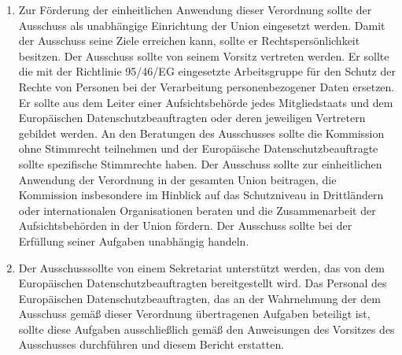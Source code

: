\begin{enumerate}
   \item Zur Förderung der einheitlichen Anwendung dieser Verordnung sollte der Ausschuss als unabhängige Einrichtung
    der Union eingesetzt werden. Damit der Ausschuss seine Ziele erreichen kann, sollte er Rechtspersönlichkeit
    besitzen. Der Ausschuss sollte von seinem Vorsitz vertreten werden. Er sollte die mit der Richtlinie 95/46/EG
    eingesetzte Arbeitsgruppe für den Schutz der Rechte von Personen bei der Verarbeitung personenbezogener Daten
    ersetzen. Er sollte aus dem Leiter einer Aufsichtsbehörde jedes Mitgliedstaats und dem Europäischen
    Datenschutzbeauftragten oder deren jeweiligen Vertretern gebildet werden. An den Beratungen des Ausschusses sollte
    die Kommission ohne Stimmrecht teilnehmen und der Europäische Datenschutzbeauftragte sollte spezifische Stimmrechte
    haben. Der Ausschuss sollte zur einheitlichen Anwendung der Verordnung in der gesamten Union beitragen, die
    Kommission insbesondere im Hinblick auf das Schutzniveau in Drittländern oder internationalen Organisationen
    beraten und die Zusammenarbeit der Aufsichtsbehörden in der Union fördern. Der Ausschuss sollte bei der Erfüllung
    seiner Aufgaben unabhängig handeln.%
   \label{eg:139}
   

   \item Der Ausschusssollte von einem Sekretariat unterstützt werden, das von dem Europäischen Datenschutzbeauftragten
    bereitgestellt wird. Das Personal des Europäischen Datenschutzbeauftragten, das an der Wahrnehmung der dem
    Ausschuss gemäß dieser Verordnung übertragenen Aufgaben beteiligt ist, sollte diese Aufgaben ausschließlich gemäß
    den Anweisungen des Vorsitzes des Ausschusses durchführen und diesem Bericht erstatten.%
   \label{eg:140}
   


\end{enumerate}
